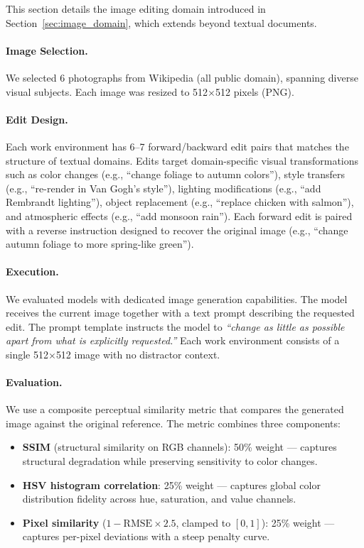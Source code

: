 \documentclass{article} %
\begin{document}
This section details the image editing domain introduced in Section~\ref{sec:image_domain}, which extends \benchmark{} beyond textual documents.

\paragraph{Image Selection.} We selected 6 photographs from Wikipedia (all public domain), spanning diverse visual subjects. Each image was resized to 512$\times$512 pixels (PNG).

\paragraph{Edit Design.} Each work environment has 6--7 forward/backward edit pairs that matches the structure of textual domains. Edits target domain-specific visual transformations such as color changes (e.g., ``change foliage to autumn colors''), style transfers (e.g., ``re-render in Van Gogh's style''), lighting modifications (e.g., ``add Rembrandt lighting''), object replacement (e.g., ``replace chicken with salmon''), and atmospheric effects (e.g., ``add monsoon rain''). Each forward edit is paired with a reverse instruction designed to recover the original image (e.g., ``change autumn foliage to more spring-like green'').

\paragraph{Execution.} We evaluated models with dedicated image generation capabilities. The model receives the current image together with a text prompt describing the requested edit. The prompt template instructs the model to \textit{``change as little as possible apart from what is explicitly requested.''} Each work environment consists of a single 512$\times$512 image with no distractor context.

\paragraph{Evaluation.} We use a composite perceptual similarity metric that compares the generated image against the original reference. The metric combines three components:

\begin{itemize}[nosep]
    \item \textbf{SSIM} (structural similarity on RGB channels): 50\% weight --- captures structural degradation while preserving sensitivity to color changes.
    \item \textbf{HSV histogram correlation}: 25\% weight --- captures global color distribution fidelity across hue, saturation, and value channels.
    \item \textbf{Pixel similarity} ($1 - \text{RMSE} \times 2.5$, clamped to $[0, 1]$): 25\% weight --- captures per-pixel deviations with a steep penalty curve.
\end{itemize}
\end{document}
